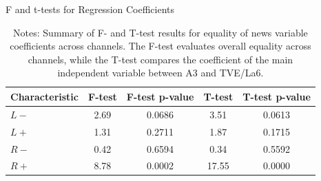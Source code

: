 \documentclass[12pt]{article}
\begin{document}
	
	
	
	\begin{table}[H]
		\centering
	
		\label{tab:tests}
		\caption{F and t-tests for Regression Coefficients}
		\begin{tabular}{lcccc}
			\hline
			Characteristic & F-test  & F-test p-value & T-test  & T-test p-value \\
			\hline
			$ {L-}$& 2.69 & 0.0686 & 3.51  & 0.0613 \\
			$ {L+}$ & 1.31 & 0.2711 & 1.87  & 0.1715 \\
			$ {R-}$ & 0.42 & 0.6594 & 0.34 & 0.5592 \\
$ {R+}$ & 8.78 & 0.0002 & 17.55  & 0.0000 \\
			\hline
		\end{tabular}
			\caption*{\small Notes: Summary of F- and T-test results for equality of news variable coefficients across channels. The F-test evaluates overall equality across channels, while the T-test compares the coefficient of the main independent variable between A3 and TVE/La6.}
	\end{table}
	
	
	
\end{document}
